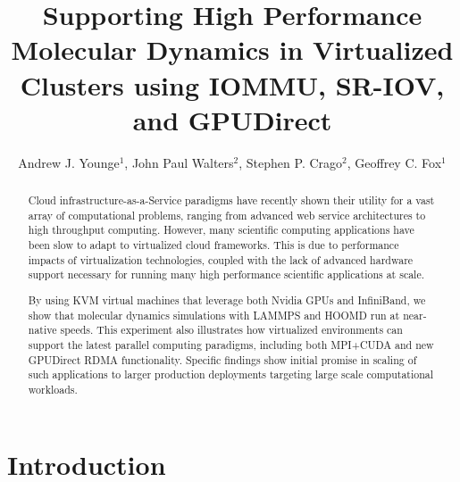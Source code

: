 \documentclass[10pt]{sigplanconf}
\title{Supporting High Performance Molecular Dynamics in Virtualized Clusters using IOMMU, SR-IOV, and GPUDirect}
\subtitle{Andrew J. Younge$^1$, John Paul Walters$^2$, Stephen P. Crago$^2$, Geoffrey C. Fox$^1$}
\begin{document}
\maketitle
\begin{abstract}

Cloud infrastructure-as-a-Service paradigms have recently shown their utility for a vast array of computational problems, ranging from advanced web service architectures to high throughput computing.  However, many scientific computing applications have been slow to adapt to virtualized cloud frameworks. This is due to performance impacts of virtualization technologies, coupled with the lack of advanced hardware support necessary for running many high performance scientific applications at scale. 

By using KVM virtual machines that leverage both Nvidia GPUs and InfiniBand, we show that molecular dynamics simulations with LAMMPS and HOOMD run at near-native speeds. This experiment also illustrates how virtualized environments can support the latest parallel computing paradigms, including both MPI+CUDA and new GPUDirect RDMA functionality. Specific findings show initial promise in scaling of such applications to larger production deployments targeting large scale computational workloads.  


 



\end{abstract}

\section{Introduction}
\end{document}
